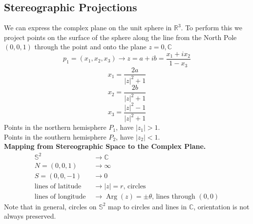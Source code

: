 \documentclass[11pt]{article}
\begin{document}
\subsection{Stereographic Projections} 
We can express the complex plane on the unit sphere in $\mathbb{R}^3$. To perform this we project points on the surface of the sphere along the line from the North Pole $(0, 0, 1)$ through the point and onto the plane $z = 0, \mathbb{C}$ \\ 
$$p_1 = (x_1, x_2, x_3) \to z = a + ib = \frac{x_1 + ix_2}{1 - x_3}$$
$$x_1 = \frac{2a}{|z|^2 + 1}$$
$$x_2 = \frac{2b}{|z|^2 + 1}$$
$$x_3 = \frac{|z|^2 - 1}{|z|^2 + 1}$$
Points in the northern hemisphere $P_1$, have $|z_1| > 1$. \\
Points in the southern hemisphere $P_2$, have $|z_2| < 1$. \\
\newline
\textbf{Mapping from Stereographic Space to the Complex Plane.} 
\begin{align*}
\mathbb{S}^2 &\to \mathbb{C}\\
N = (0, 0, 1) &\to \infty \\
S = (0, 0, -1) &\to 0 \\
\mbox{lines of latitude } &\to |z| = r \mbox{, circles} \\
\mbox{lines of longitude } &\to \operatorname{Arg}(z) = \pm\theta \mbox{, lines through } (0, 0) 
\end{align*}
Note that in general, circles on $\mathbb{S}^2$ map to circles and lines in $\mathbb{C}$, orientation is not always preserved. 
\end{document}
